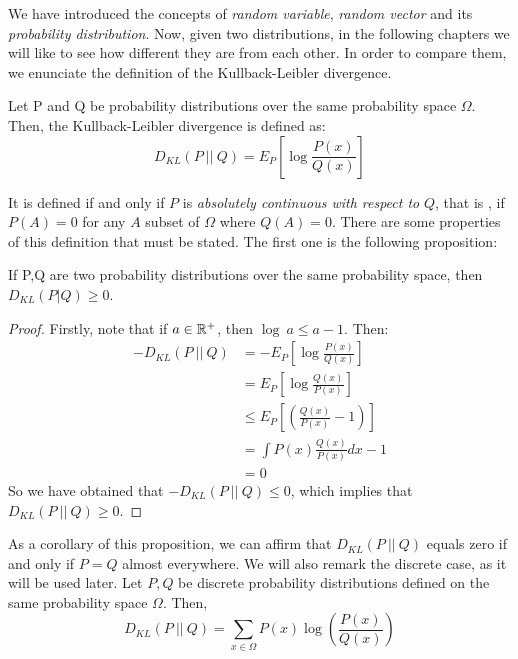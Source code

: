 We have introduced the concepts of \emph{random variable},  \emph{random vector} and its \emph{probability distribution}.  Now, given two distributions, in the following chapters we will like to see how different they are from each other.
In order to compare them, we enunciate the definition of the Kullback-Leibler divergence.

\begin{ndef}
Let P and Q be probability distributions over the same probability space $\Omega$. Then, the Kullback-Leibler divergence is defined as:
$$
D_{KL}(P \ || \ Q) = E_P\left[\log{\frac{P(x)}{Q(x)}}\right]
$$
\end{ndef}
It is defined if and only if $P$ is \emph{absolutely continuous with respect to} $Q$, that is , if $P(A) = 0$ for any $A$ subset of $\Omega$ where $Q(A) = 0$. There are some properties of this definition that must be stated. The first one is the following proposition:

\begin{nprop}
If P,Q are two probability distributions over the same probability space, then $D_{KL}(P|Q) \geq 0$.
\end{nprop}
\begin{proof}
Firstly, note that if $a \in \mathbb{R}^+$, then $\log \ a \leq a-1$. Then:
\begin{align*}
-D_{KL}(P \ || \ Q) & = - E_P\left[\log{\frac{P(x)}{Q(x)}}\right] \\
             & = E_P\left[\log{\frac{Q(x)}{P(x)}}\right] \\
             & \leq E_P\left[\left(\frac{Q(x)}{P(x)} - 1\right)\right]\\
             & = \int P(x) \frac{Q(x)}{P(x)} dx -1 \\
             & = 0
\end{align*}
So we have obtained that $-D_{KL}(P\ ||\ Q) \leq 0$, which implies that $D_{KL}(P\ || \ Q) \geq 0$.
\end{proof}
As a corollary of this proposition, we can affirm that $D_{KL}(P\ ||\ Q)$ equals zero if and only if $P = Q$ almost everywhere. We will also remark the discrete case, as it will be used later. Let $P,Q$ be discrete probability distributions
defined on the same probability space $\Omega$. Then, 
$$
D_{KL}(P\ ||\ Q) = \sum_{x \in \Omega} P(x) \log \left( \frac{P(x)}{Q(x)}\right)
$$